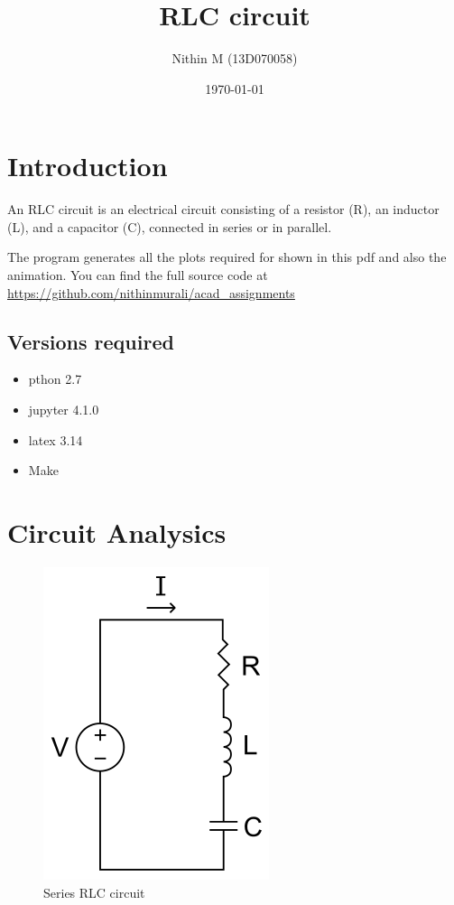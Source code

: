 \documentclass[11pt]{article}
\title{RLC circuit}
\author{Nithin M (13D070058) }
\date{\today}
\begin{document}
\maketitle

\section{Introduction}
An RLC circuit is an electrical circuit consisting of a resistor (R), an inductor (L), and a capacitor (C), connected in series or in parallel. 

The program generates all the plots required for shown in this pdf and also the animation. You can find the full source code at \url{https://github.com/nithinmurali/acad_assignments}

\subsection{Versions required}
\begin{itemize}
\item pthon 2.7
\item jupyter 4.1.0
\item latex 3.14
\item Make 
\end{itemize}



\section{Circuit Analysics}
\begin{figure}[H]
	\begin{center}
	\includegraphics[scale=0.5]{RLC_series_circuit.png}
	\caption{Series RLC circuit}
	\centering
	\end{center}
\end{figure}
\end{document}
